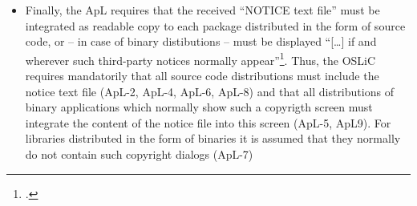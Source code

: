 \begin{itemize}
  \item Finally, the ApL requires that the received “NOTICE text file” must be
  integrated as readable copy to each package distributed in the form of source
  code, or – in case of binary distibutions – must be displayed
  \enquote{[\ldots] if and wherever such third-party notices normally
  appear}\footcite[cf.][\nopage wp\ §4.4]{Apl20OsiLicense2004a}. Thus, the OSLiC
  requires mandatorily that all source code distributions must include the
  notice text file (ApL-2, ApL-4, ApL-6, ApL-8) and that all distributions of
  binary applications which normally show such a copyrigth screen must integrate
  the content of the notice file into this screen (ApL-5, ApL9). For libraries
  distributed in the form of binaries it is assumed that they normally do not
  contain such copyright dialogs (ApL-7)
\end{itemize}








%
